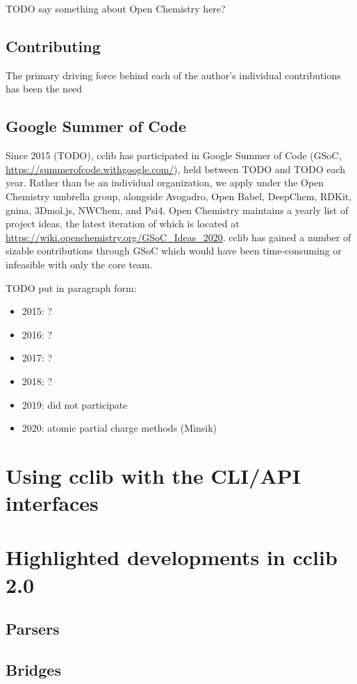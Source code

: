 \documentclass[num-refs]{wiley-article}
\begin{document}
TODO say something about Open Chemistry here?

\subsection{Contributing}

The primary driving force behind each of the author's individual contributions has been the need

\subsection{Google Summer of Code}

Since 2015 (TODO), cclib has participated in Google Summer of Code (GSoC, \url{https://summerofcode.withgoogle.com/}), held between TODO and TODO each year.  Rather than be an individual organization, we apply under the Open Chemistry umbrella group, alongside Avogadro, Open Babel, DeepChem, RDKit, gnina, 3Dmol.js, NWChem, and Psi4.  Open Chemistry maintains a yearly list of project ideas, the latest iteration of which is located at \url{https://wiki.openchemistry.org/GSoC_Ideas_2020}.  cclib has gained a number of sizable contributions through GSoC which would have been time-consuming or infeasible with only the core team.

TODO put in paragraph form:
\begin{itemize}
\item 2015: ?
\item 2016: ?
\item 2017: ?
\item 2018: ?
\item 2019: did not participate
\item 2020: atomic partial charge methods (Minsik)
\end{itemize}

\section{Using cclib with the CLI/API interfaces}

\section{Highlighted developments in cclib 2.0}
\subsection{Parsers}
\subsection{Bridges}
\end{document}

